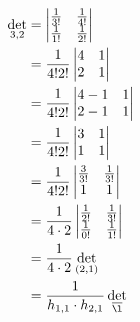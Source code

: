 \documentclass{article}
\begin{document}
\begin{align*}
  \det_{3, 2} &= \left| \begin{matrix}
    \frac{1}{3!} & \frac{1}{4!}\\
    \frac{1}{1!} & \frac{1}{2!}
  \end{matrix} \right|\\
  &= \frac{1}{4!2!} \left| \begin{matrix}
    4 & 1 \\
    2 & 1
  \end{matrix} \right|\\
  &= \frac{1}{4!2!}\left| \begin{matrix}
    4-1 & 1 \\
    2-1 & 1
  \end{matrix} \right|\\
  &= \frac{1}{4!2!}\left| \begin{matrix}
    3 & 1 \\
    1 & 1
  \end{matrix} \right|\\
  &= \frac{1}{4!2!}\left| \begin{matrix}
    \frac{3}{3!} & \frac{1}{3!} \\
    1 & 1
  \end{matrix} \right|\\
  &= \frac{1}{4 \cdot 2}\left| \begin{matrix}
    \frac{1}{2!} & \frac{1}{3!} \\
    \frac{1}{0!} & \frac{1}{1!}
  \end{matrix} \right|\\
  &= \frac{1}{4 \cdot 2} \det_{(2, 1)}\\
  &= \frac{1}{h_{1, 1} \cdot h_{2, 1}}\det_{\overline{\l}}
\end{align*}
\end{document}
